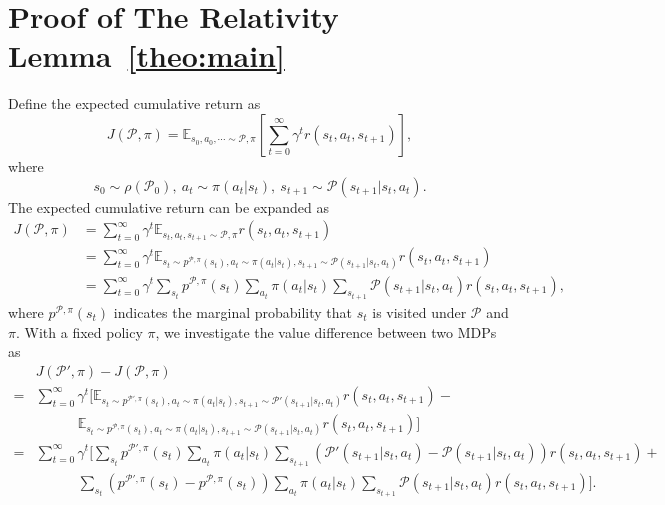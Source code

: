 \documentclass[letterpaper]{article} %
\def\E{{\mathbb{E}}}
\def\P{{\mathcal{P}}}
\begin{document}
\section{Proof of The Relativity Lemma~\ref{theo:main}}
\label{sec:proof_relativity}
\proof
Define the expected cumulative return as
{\small
\[
J(\P,\pi)=\E_{s_0,a_0,\cdots\sim\P,\pi}\left[
\sum_{t=0}^{\infty}\gamma^t r(s_t,a_t,s_{t+1})
\right],
\]
}\noindent
where
{\small
\[
s_0\sim\rho(\P_0),\ a_t\sim\pi(a_t|s_t),\ s_{t+1}\sim\P(s_{t+1}|s_t,a_t).
\]
}\noindent
The expected cumulative return can be expanded as
{\small
\begin{align*}
J(\P,\pi)
&=\sum_{t=0}^{\infty}\gamma^t\E_{s_t,a_t,s_{t+1}\sim\P,\pi}
r(s_t,a_t,s_{t+1})
\\
&=\sum_{t=0}^{\infty}\gamma^t\E_{s_t\sim p^{\P,\pi}(s_t),a_t\sim\pi(a_t|s_t),s_{t+1}\sim\P(s_{t+1}|s_t,a_t)}
r(s_t,a_t,s_{t+1})
\\
&=\sum_{t=0}^{\infty}\gamma^t\sum_{s_t}p^{\P,\pi}(s_t)
\sum_{a_t}\pi(a_t|s_t)
\sum_{s_{t+1}}\P(s_{t+1}|s_t,a_t)
r(s_t,a_t,s_{t+1}),
\end{align*}
}\noindent
where $p^{\P,\pi}(s_t)$ indicates the marginal probability that $s_t$ is visited under $\P$ and $\pi$.
With a fixed policy $\pi$, we investigate the value difference between two MDPs as
{\small
\begin{align}
&J(\P',\pi)-J(\P,\pi)
\nonumber
\\
=&\sum_{t=0}^{\infty}\gamma^t
\big[
\E_{s_t\sim p^{\P',\pi}(s_t),a_t\sim\pi(a_t|s_t),s_{t+1}\sim\P'(s_{t+1}|s_t,a_t)}
r(s_t,a_t,s_{t+1})-
\nonumber
\\
&\qquad\quad
\E_{s_t\sim p^{\P,\pi}(s_t),a_t\sim\pi(a_t|s_t),s_{t+1}\sim\P(s_{t+1}|s_t,a_t)}
r(s_t,a_t,s_{t+1})
\big]
\nonumber
\\
=&\sum_{t=0}^{\infty}\gamma^t\bigg[
\sum_{s_t}p^{\P',\pi}(s_t)
\sum_{a_t}\pi(a_t|s_t)
\sum_{s_{t+1}}\left(\P'(s_{t+1}|s_t,a_t)-\P(s_{t+1}|s_t,a_t)\right)
r(s_t,a_t,s_{t+1})+
\nonumber
\\
&\qquad\quad
\sum_{s_t}\left(p^{\P',\pi}(s_t)-p^{\P,\pi}(s_t)\right)
\sum_{a_t}\pi(a_t|s_t)
\sum_{s_{t+1}}\P(s_{t+1}|s_t,a_t)
r(s_t,a_t,s_{t+1})\bigg].
\label{eq:1}
\end{align}
}\noindent
\end{document}
